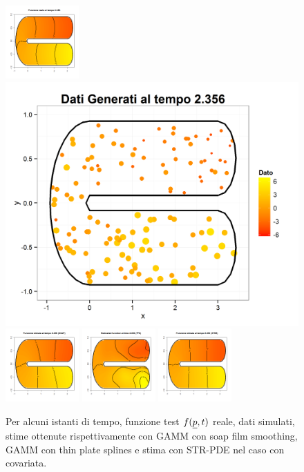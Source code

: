 \documentclass[a4paper,11pt,twoside,openright]{book}							%
\begin{document}
\begin{landscape}
\begin{figure}
\includegraphics[width=0.25\textwidth]{immagini/simulazioni_covar/REALEtempo4.png}
\includegraphics[height=0.25\textwidth]{immagini/simulazioni_covar/Dati_tempo4.png}
\includegraphics[width=0.25\textwidth]{immagini/simulazioni_covar/SOAPtempo4.png}
\includegraphics[width=0.25\textwidth]{immagini/simulazioni_covar/TPStempo4.png}
\includegraphics[width=0.25\textwidth]{immagini/simulazioni_covar/STSRtempo4.png}

\caption{Per alcuni istanti di tempo, funzione test $f(\protect\underline{p},t)$ reale, dati simulati, stime ottenute rispettivamente con GAMM con soap film smoothing, GAMM con thin plate splines e stima con STR-PDE nel caso con covariata.}
\label{fig:confronto_altri_metodi_cov}
\end{figure}
\end{landscape}
\end{document}

